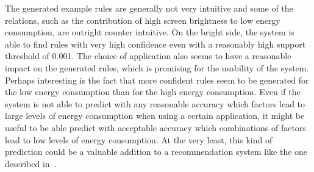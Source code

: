 The generated example rules are generally not very intuitive and some of the relations, such as the contribution of high screen brightness to low energy consumption, are outright counter intuitive. On the bright side, the system is able to find rules with very high confidence even with a reasonably high support threshold of 0.001. The choice of application also seems to have a reasonable impact on the generated rules, which is promising for the usability of the system. Perhaps interesting is the fact that more confident rules seem to be generated for the low energy consumption than for the high energy consumption. Even if the system is not able to predict with any reasonable accuracy which factors lead to large levels of energy consumption when using a certain application, it might be useful to be able predict with acceptable accuracy which combinations of factors lead to low levels of energy consumption. At the very least, this kind of prediction could be a valuable addition to a recommendation system like the one described in~\cite{PELTONEN201671}.     